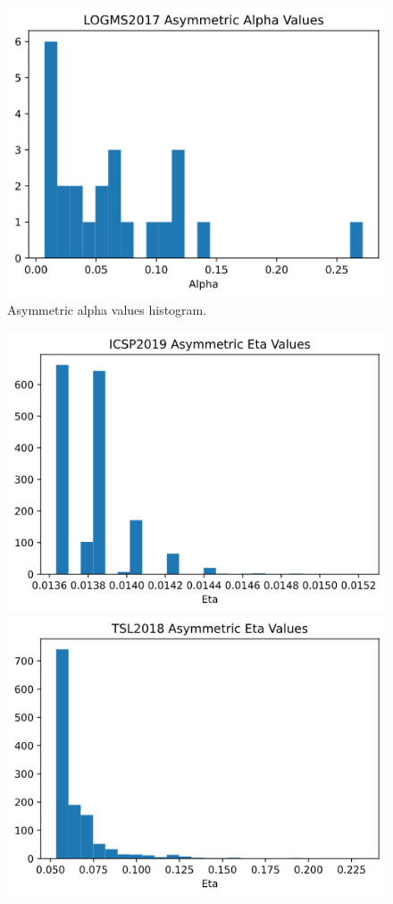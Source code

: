 \documentclass[a4paper, 12pt, twoside]{article}
\numberwithin{equation}{section} %
\begin{document}
{{\begin{appendices}
\begin{figure}[htb]
  \vspace{0.00mm}
  
   \includegraphics[width=0.65\linewidth]{LOGMS_alpha.png}

\caption{Asymmetric alpha values histogram.}
\end{figure}

\begin{figure}[htb]
  \centering
  \includegraphics[width=0.65\linewidth]{ICSP_eta.png}

  \vspace{0.00mm}

  \includegraphics[width=0.65\linewidth]{TSL_eta.png}
  

\end{figure}
\end{appendices}}}
\end{document}
